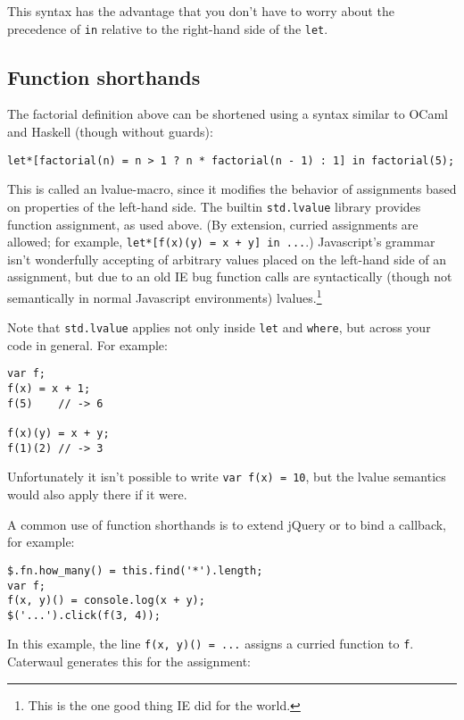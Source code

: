 \documentclass{report}
\begin{document}
      This syntax has the advantage that you don't have to worry about the precedence of {\tt in} relative to the right-hand side of the {\tt let}.

\subsection{Function shorthands}\label{sec:the-std-library-let-and-where-fn}
      The factorial definition above can be shortened using a syntax similar to OCaml and Haskell (though without guards):

\begin{verbatim}
let*[factorial(n) = n > 1 ? n * factorial(n - 1) : 1] in factorial(5);
\end{verbatim}

      This is called an lvalue-macro, since it modifies the behavior of assignments based on properties of the left-hand side. The builtin {\tt std.lvalue} library provides function
      assignment, as used above. (By extension, curried assignments are allowed; for example, {\tt let*[f(x)(y) = x + y] in ...}.) Javascript's grammar isn't wonderfully accepting of arbitrary
      values placed on the left-hand side of an assignment, but due to an old IE bug function calls are syntactically (though not semantically in normal Javascript environments)
      lvalues.\footnote{This is the one good thing IE did for the world.}

      Note that {\tt std.lvalue} applies not only inside {\tt let} and {\tt where}, but across your code in general. For example:

\begin{verbatim}
var f;
f(x) = x + 1;
f(5)    // -> 6

f(x)(y) = x + y;
f(1)(2) // -> 3
\end{verbatim}

      Unfortunately it isn't possible to write {\tt var f(x) = 10}, but the lvalue semantics would also apply there if it were.

      A common use of function shorthands is to extend jQuery or to bind a callback, for example:

\begin{verbatim}
$.fn.how_many() = this.find('*').length;
var f; 
f(x, y)() = console.log(x + y);
$('...').click(f(3, 4));
\end{verbatim}

      In this example, the line \verb|f(x, y)() = ...| assigns a curried function to {\tt f}. Caterwaul generates this for the assignment:
\end{document}
